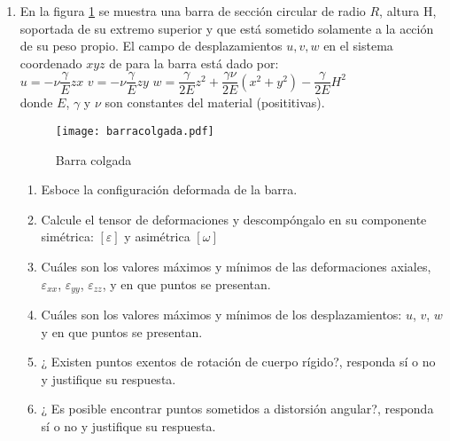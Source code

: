\documentclass[../notas medios.tex]{subfiles}
\begin{document}
\begin{enumerate}
Se pide determinar lo siguiente:
	
\begin{enumerate}
	\item Calcular los desplazamientos de los puntos $A$, $B$ y $C$ para cada uno de los estados de deformaci\'on y dibujar las configuraciones deformadas.
	\item Si se sabe que las dimensiones del rect\'angulo $b=1.00$ y $h=1.00$ y los valores de las transformaciones son $d=0.01$, $e=0.005$ y $f=0.0025$. Calcular las direcciones principales y los valores propios para la superposici\'on lineal de las deformaciones. 	
\end{enumerate}

\newpage
\item  \label{punto04_d} En la figura \cref{BarraColgada} se muestra una barra de sección circular de radio $R$, altura H, soportada de su extremo superior y que está sometido solamente a la acción de su peso propio. El campo de desplazamientos $u,v,w$ en el sistema coordenado $xyz$ de para la barra está dado por: \\

	$u= -\nu \dfrac{\gamma}{E} z x $ \hspace{1cm}	
	$v= -\nu \dfrac{\gamma}{E} z y $ \hspace{1cm}	
	$w= \dfrac{\gamma}{2E} z^2 +\dfrac{\gamma \nu}{2E} (x^2+y^2)-\dfrac{\gamma}{2E} H^2  $ \\
	
donde $E$, $\gamma$ y $\nu$ son constantes del material (posititivas). 
	
\begin{figure}[H]
	\centering
	\texttt{[image: barracolgada.pdf]} \label{figure1}
	\caption{Barra colgada}
	\label{BarraColgada}
\end{figure}
%
\begin{enumerate}
% 
	\item Esboce la configuraci\'on deformada de la barra.	
	\item Calcule el tensor de deformaciones y descompóngalo en su componente simétrica: $[\varepsilon]$ y asimétrica  $[\omega]$
	\item Cuáles son los valores máximos y mínimos de las deformaciones axiales, $\varepsilon_{xx}$, $\varepsilon_{yy}$, $\varepsilon_{zz}$, y en que puntos se presentan.
	\item Cuáles son los valores máximos y mínimos de los desplazamientos: $u$, $v$, $w$ y en que puntos se presentan.
	\item ¿ Existen puntos exentos de rotaci\'on de cuerpo r\'igido?, responda s\'i o no y justifique su respuesta.	
	\item ¿ Es posible encontrar puntos sometidos a distorsión angular?, 
	responda s\'i o no y justifique su respuesta.
%
\end{enumerate}
%
\newpage


\end{enumerate}
\end{document}
